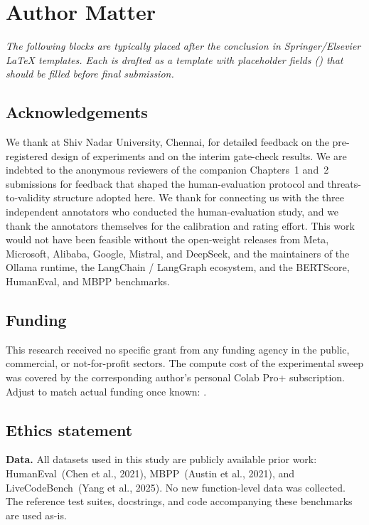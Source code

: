 \section{Author Matter}

\emph{The following blocks are typically placed after the conclusion in Springer/Elsevier LaTeX templates. Each is drafted as a template with placeholder fields (\PLACEHOLDER) that should be filled before final submission.}


\subsection{Acknowledgements}

We thank  at Shiv Nadar University, Chennai, for detailed feedback on the pre-registered design of experiments and on the interim gate-check results. We are indebted to the anonymous reviewers of the companion Chapters~1 and~2 submissions for feedback that shaped the human-evaluation protocol and threats-to-validity structure adopted here. We thank  for connecting us with the three independent annotators who conducted the human-evaluation study, and we thank the annotators themselves for the calibration and rating effort. This work would not have been feasible without the open-weight releases from Meta, Microsoft, Alibaba, Google, Mistral, and DeepSeek, and the maintainers of the Ollama runtime, the LangChain / LangGraph ecosystem, and the BERTScore, HumanEval, and MBPP benchmarks.

\subsection{Funding}

This research received no specific grant from any funding agency in the public, commercial, or not-for-profit sectors. The compute cost of the experimental sweep was covered by the corresponding author's personal Colab Pro+ subscription. Adjust to match actual funding once known: .

\subsection{Ethics statement}

\textbf{Data.} All datasets used in this study are publicly available prior work: HumanEval~(Chen et al., 2021), MBPP~(Austin et al., 2021), and LiveCodeBench~(Yang et al., 2025). No new function-level data was collected. The reference test suites, docstrings, and code accompanying these benchmarks are used as-is.

